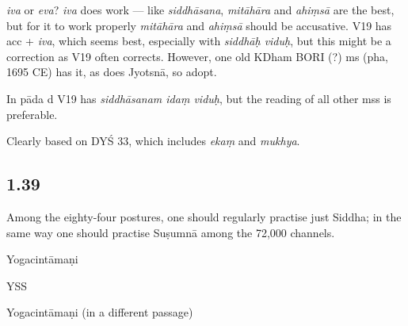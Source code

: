 \begin{ekdosis}
\begin{testimonia}[hp01_038]
\end{testimonia}

\begin{philcomm}[hp01_038]
\emph{iva} or \emph{eva}? \emph{iva} does work — like \emph{siddhāsana}, \emph{mitāhāra} and \emph{ahiṃsā} are the best, but for it to work properly \emph{mitāhāra} and \emph{ahiṃsā} should be accusative. V19 has acc + \emph{iva}, which seems best, especially with \emph{siddhāḥ viduḥ}, but this might be a correction as V19 often corrects. However, one old KDham BORI (?) ms (pha, 1695 CE) has it, as does Jyotsnā, so adopt.

In pāda d V19 has \emph{siddhāsanam idaṃ viduḥ}, but the reading of all other mss is preferable.

Clearly based on DYŚ 33, which includes \emph{ekaṃ} and \emph{mukhya}.
\end{philcomm}

\subsection*{1.39}
\begin{translation}[hp01_039]
Among the eighty-four postures, one should regularly practise just Siddha; in the same way one should practise Suṣumnā among the 72,000 channels.
\end{translation}

\begin{sources}[hp01_039]
\end{sources}

\begin{testimonia}[hp01_039]
Yogacintāmaṇi

\begin{versinnote}
\end{versinnote}

YSS

\begin{versinnote}
\end{versinnote}

Yogacintāmaṇi (in a different passage)
​​
\begin{versinnote}
\end{versinnote}


\end{testimonia}
\end{ekdosis}
